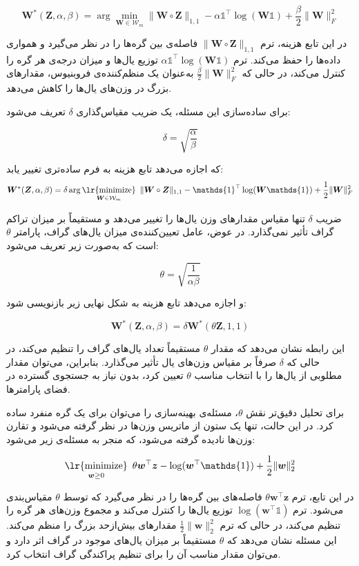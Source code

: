 \documentclass[10pt,twocolumn,a4paper]{article}
\newcommand\minimize[1]{\mathop{\text{\lr{minimize}}}\limits_{#1}\ }
\begin{document}
	\[
	\bm{W}^*(\bm{Z}, \alpha, \beta) = \arg \min_{\bm{W} \in \mathcal{W}_m} \|\bm{W} \circ \bm{Z}\|_{1,1} - \alpha \mathds{1}^\top \log(\bm{W} \mathds{1}) + \frac{\beta}{2} \|\bm{W}\|_F^2
	\]
	
	در این تابع هزینه، ترم \( \|\bm{W} \circ \bm{Z}\|_{1,1} \) فاصله‌ی بین گره‌ها را در نظر می‌گیرد و همواری داده‌ها را حفظ می‌کند. ترم \( \alpha \mathds{1}^\top \log(\bm{W} \mathds{1}) \) توزیع یال‌ها و میزان درجه‌ی هر گره را کنترل می‌کند، در حالی که \( \frac{\beta}{2} \|\bm{W}\|_F^2 \) به‌عنوان یک منظم‌کننده‌ی فروبنیوس، مقدارهای بزرگ در وزن‌های یال‌ها را کاهش می‌دهد.
	
	برای ساده‌سازی این مسئله، یک ضریب مقیاس‌گذاری \( \delta \) تعریف می‌شود:
	
	\[
	\delta = \sqrt{\frac{\alpha}{\beta}}
	\]
	
	که اجازه می‌دهد تابع هزینه به فرم ساده‌تری تغییر یابد:
	\begin{align}
		\bm{W}^*(\bm{Z}, \alpha, \beta) = \delta \arg \minimize{\bm{W} \in \mathcal{W}_m} \|\bm{W} \circ \bm{Z}\|_{1,1} 
		- \mathds{1}^\top \log(\bm{W} \mathds{1}) + \frac{1}{2} \|\bm{W}\|_F^2
	\end{align}
	
	ضریب \( \delta \) تنها مقیاس مقدارهای وزن یال‌ها را تغییر می‌دهد و مستقیماً بر میزان تراکم گراف تأثیر نمی‌گذارد. در عوض، عامل تعیین‌کننده‌ی میزان یال‌های گراف، پارامتر \( \theta \) است که به‌صورت زیر تعریف می‌شود:
	
	\[
	\theta = \sqrt{\frac{1}{\alpha \beta}}
	\]
	
	و اجازه می‌دهد تابع هزینه به شکل نهایی زیر بازنویسی شود:
	
	\[
	\bm{W}^*(\bm{Z}, \alpha, \beta) = \delta \bm{W}^*(\theta \bm{Z}, 1, 1)
	\]
	
	این رابطه نشان می‌دهد که مقدار \( \theta \) مستقیماً تعداد یال‌های گراف را تنظیم می‌کند، در حالی که \( \delta \) صرفاً بر مقیاس وزن‌های یال تأثیر می‌گذارد. بنابراین، می‌توان مقدار مطلوبی از یال‌ها را با انتخاب مناسب \( \theta \) تعیین کرد، بدون نیاز به جستجوی گسترده در فضای پارامترها.
	
	برای تحلیل دقیق‌تر نقش \( \theta \)، مسئله‌ی بهینه‌سازی را می‌توان برای یک گره منفرد ساده کرد. در این حالت، تنها یک ستون از ماتریس وزن‌ها در نظر گرفته می‌شود و تقارن وزن‌ها نادیده گرفته می‌شود، که منجر به مسئله‌ی زیر می‌شود:
	
	\[
	\minimize{\bm{w} \geq 0} \theta \bm{w}^\top \bm{z} - \log(\bm{w}^\top \mathds{1}) + \frac{1}{2} \|\bm{w}\|_2^2
	\]
	
	در این تابع، ترم \( \theta \bm{w}^\top \bm{z} \) فاصله‌های بین گره‌ها را در نظر می‌گیرد که توسط \( \theta \) مقیاس‌بندی می‌شود. ترم \( \log(\bm{w}^\top \mathds{1}) \) توزیع یال‌ها را کنترل می‌کند و مجموع وزن‌های هر گره را تنظیم می‌کند، در حالی که ترم \( \frac{1}{2} \|\bm{w}\|_2^2 \) مقدارهای بیش‌ازحد بزرگ را منظم می‌کند. این مسئله نشان می‌دهد که \( \theta \) مستقیماً بر میزان یال‌های موجود در گراف اثر دارد و می‌توان مقدار مناسب آن را برای تنظیم پراکندگی گراف انتخاب کرد.
	
\end{document}

